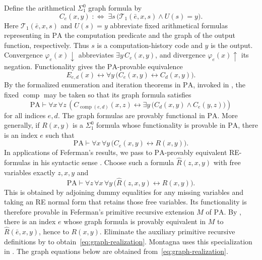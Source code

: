 \documentclass[11pt]{article}
\newcommand{\PA}{\mathrm{PA}}
\newcommand{\comp}{\operatorname{comp}}
\begin{document}
Define the arithmetical $\Sigma^0_1$ graph formula by
\[
 C_e(x,y)\;:\Longleftrightarrow\;
 \exists s\,\bigl(\mathcal{T}_1(\bar e,x,s)\land U(s)=y\bigr).
\]
Here $\mathcal{T}_1(\bar e,x,s)$ and $U(s)=y$ abbreviate fixed arithmetical
formulas representing in $\PA$ the computation predicate and the
graph of the output function, respectively.
Thus $s$ is a computation-history code and $y$ is the output.
Convergence $\varphi_e(x)\downarrow$ abbreviates
$\exists y\,C_e(x,y)$, and divergence $\varphi_e(x)\uparrow$ its
negation. Functionality gives the $\PA$-provable equivalence
\[
 E_{e,d}(x)\longleftrightarrow
 \forall y\,\bigl(C_e(x,y)\longleftrightarrow C_d(x,y)\bigr).
\]
By the formalized enumeration and iteration theorems in $\PA$, invoked in
\cite[p.~647]{DiPaolaMontagna}, the fixed $\comp$ may be taken so that its
graph formula satisfies
\begin{equation}\label{eq:composition-graph}
 \PA\vdash\forall x\,\forall z\,
 \left(C_{\comp(e,d)}(x,z)\longleftrightarrow
       \exists y\,\bigl(C_d(x,y)\land C_e(y,z)\bigr)\right)
\end{equation}
for all indices $e,d$. The graph formulas are provably functional in
$\PA$. More generally, if $R(x,y)$ is a $\Sigma^0_1$ formula whose
functionality is provable in $\PA$, there is an index $e$ such that
\begin{equation}\label{eq:graph-realization}
 \PA\vdash\forall x\,\forall y\,
 \bigl(C_e(x,y)\longleftrightarrow R(x,y)\bigr).
\end{equation}
In applications of Feferman's results, we pass to
$\PA$-provably equivalent RE-formulas in his syntactic sense
\cite[p.~267]{Feferman}.
Choose such a formula $\widehat R(z,x,y)$ with free variables
exactly $z,x,y$ and
\[
 \PA\vdash\forall z\,\forall x\,\forall y\,
 \bigl(\widehat R(z,x,y)\longleftrightarrow R(x,y)\bigr).
\]
This is obtained by adjoining dummy equalities for any missing
variables and taking an RE normal form that retains those
free variables.
Its functionality is therefore provable in Feferman's primitive
recursive extension $M$ of $\PA$.
By \cite[Theorem~2.13, p.~273]{Feferman}, there is an index $e$
whose graph formula is provably equivalent in $M$ to
$\widehat R(\bar e,x,y)$, hence to $R(x,y)$.
Eliminate the auxiliary
primitive recursive definitions by \cite[Theorem~2.15, p.~274]{Feferman}
to obtain~\eqref{eq:graph-realization}. Montagna uses this specialization
in \cite[p.~109, proof of~$(*)$]{Montagna}.
The graph equations below are obtained from~\eqref{eq:graph-realization}.
\end{document}
